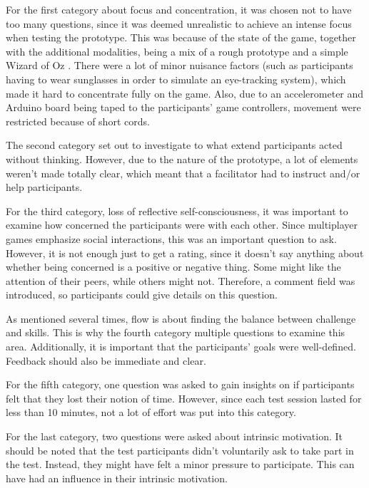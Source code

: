 For the first category about focus and concentration, it was chosen not to have too many questions, since it was deemed unrealistic to achieve an intense focus when testing the prototype. This was because of the state of the game, together with the additional modalities, being a mix of a rough prototype and a simple Wizard of Oz \citep{InteractDesign}. There were a lot of minor nuisance factors (such as participants having to wear sunglasses in order to simulate an eye-tracking system), which made it hard to concentrate fully on the game. Also, due to an accelerometer and Arduino board being taped to the participants' game controllers, movement were restricted because of short cords.

The second category set out to investigate to what extend participants acted without thinking. However, due to the nature of the prototype, a lot of elements weren't made totally clear, which meant that a facilitator had to instruct and/or help participants.

For the third category, loss of reflective self-consciousness, it was important to examine how concerned the participants were with each other. Since multiplayer games emphasize social interactions, this was an important question to ask. However, it is not enough just to get a rating, since it doesn't say anything about whether being concerned is a positive or negative thing. Some might like the attention of their peers, while others might not. Therefore, a comment field was introduced, so participants could give details on this question.

As mentioned several times, flow is about finding the balance between challenge and skills. This is why the fourth category multiple questions to examine this area. Additionally, it is important that the participants' goals were well-defined. Feedback should also be immediate and clear.

For the fifth category, one question was asked to gain insights on if participants felt that they lost their notion of time. However, since each test session lasted for less than 10 minutes, not a lot of effort was put into this category.

For the last category, two questions were asked about intrinsic motivation. It should be noted that the test participants didn't voluntarily ask to take part in the test. Instead, they might have felt a minor pressure to participate. This can have had an influence in their intrinsic motivation.
